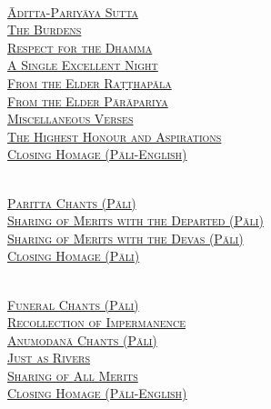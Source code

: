 \begin{center}
  \medskip

  {\libertinusFont\selectfont\textbf{\textsc{}}}\\

  \textsc{
    \hyperref[aditta-pariyaya]{Āditta-Pariyāya Sutta} \pageref{aditta-pariyaya}\\
    \hyperref[burdens]{The Burdens} \pageref{burdens}\\
    \hyperref[respect-for-the-dhamma]{Respect for the Dhamma} \pageref{respect-for-the-dhamma}\\
    \hyperref[single-excellent-night]{A Single Excellent Night} \pageref{single-excellent-night}\\
    \hyperref[ratthapala]{From the Elder Raṭṭhapāla} \pageref{ratthapala}\\
    \hyperref[parapariya]{From the Elder Pārāpariya} \pageref{parapariya}\\
    \hyperref[misc-verses]{Miscellaneous Verses} \pageref{misc-verses}\\
    \hyperref[highest-honour-aspirations]{The Highest Honour and Aspirations} \pageref{highest-honour-aspirations}\\
    \hyperref[closing-homage]{Closing Homage (Pāli-English)}} \pageref{closing-homage}\\

  \medskip

  {\libertinusFont\selectfont\textbf{\textsc{}}}\\

  \textsc{
    \hyperref[deva-aradhana]{Paritta Chants (Pāli)} \pageref{deva-aradhana}\\
    \hyperref[sharing-merits-departed]{Sharing of Merits with the Departed (Pāli)} \pageref{sharing-merits-departed}\\
    \hyperref[sharing-merits-devas]{Sharing of Merits with the Devas (Pāli)} \pageref{sharing-merits-devas}\\
    \hyperref[closing-homage]{Closing Homage (Pāli)}} \pageref{closing-homage}\\

  \medskip

  {\libertinusFont\selectfont\textbf{\textsc{}}}\\

  \textsc{
    \hyperref[pubba-bhaga-nama-kara-patho]{Funeral Chants (Pāli)} \pageref{pubba-bhaga-nama-kara-patho}\\
    \hyperref[recollection-impermanence]{Recollection of Impermanence} \pageref{recollection-impermanence}\\
    \hyperref[yatha-vari-vaha-pura]{Anumodanā Chants (Pāli)} \pageref{yatha-vari-vaha-pura}\\
    \hyperref[just-as-rivers]{Just as Rivers} \pageref{just-as-rivers}\\
    \hyperref[sharing-all-merits]{Sharing of All Merits} \pageref{sharing-all-merits}\\
    \hyperref[closing-homage]{Closing Homage (Pāli-English)}} \pageref{closing-homage}\\

\end{center}
